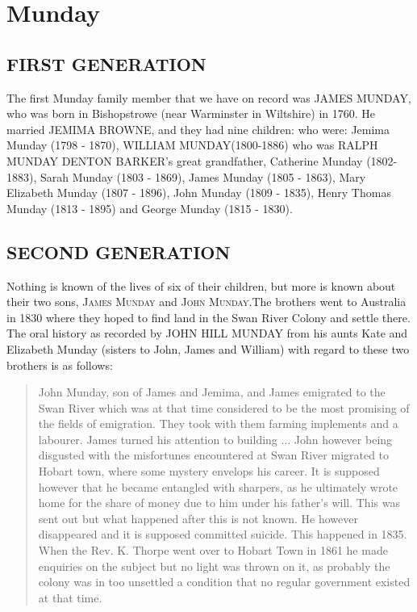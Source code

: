 \section{Munday}

\subsection{FIRST GENERATION}

The first Munday family member that we have on record was \uppercase{James Munday}, who was born in Bishopstrowe (near Warminster in Wiltshire) in 1760.  He  married \uppercase{Jemima Browne}, and they had nine children: who were: Jemima Munday (1798 - 1870), \uppercase{William Munday}(1800-1886) who was \uppercase{Ralph Munday Denton Barker}'s great grandfather,  Catherine Munday (1802-1883), Sarah Munday (1803 - 1869), James Munday (1805 - 1863), Mary Elizabeth Munday (1807 - 1896), John Munday (1809 - 1835), Henry Thomas Munday (1813 - 1895) and George Munday (1815 - 1830). 

\subsection{SECOND GENERATION}

Nothing is known of the lives of six of their children, but more is known about their two sons, \textsc{James Munday} and \textsc{John Munday}.The brothers went to Australia in 1830 where they hoped to find land in the Swan River Colony and settle there. 
The oral history as recorded by \uppercase{John Hill Munday} from his aunts Kate and Elizabeth Munday (sisters to John, James and William) with regard to these two brothers is as follows: 

\begin{quotation}
John Munday, son of James and Jemima, and James emigrated to the Swan River which was at that time considered to be the most promising of the fields of emigration. They took with them farming implements and a labourer. James turned his attention to building ... John however being disgusted with the misfortunes encountered at Swan River migrated to Hobart town, where some mystery envelops his career. It is supposed however that he became entangled with sharpers, as he ultimately wrote home for the share of money due to him under his father's will. This was sent out but what happened after this is not known. He however disappeared and it is supposed committed suicide. This happened in 1835. When the Rev. K. Thorpe went over to Hobart Town in 1861 he made enquiries on the subject but no light was thrown on it, as probably the colony was in too unsettled a condition that no regular government existed at that time.
\end{quotation}

